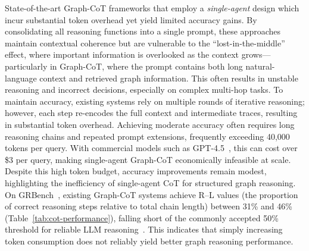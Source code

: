 State-of-the-art Graph-CoT frameworks that employ a \textit{single-agent} design which incur substantial token overhead yet yield limited accuracy gains. 
%
By consolidating all reasoning functions into a single prompt, these approaches maintain contextual coherence but are vulnerable to the ``lost-in-the-middle'' effect, where important information is overlooked as the context grows—particularly in Graph-CoT, where the prompt contains both long natural-language context and retrieved graph information. 
%
This often results in unstable reasoning and incorrect decisions, especially on complex multi-hop tasks. 
%
To maintain accuracy, existing systems rely on multiple rounds of iterative reasoning; however, each step re-encodes the full context and intermediate traces, resulting in substantial token overhead. 
%
Achieving moderate accuracy often requires long reasoning chains and repeated prompt extensions, frequently exceeding 40{,}000 tokens per query. With commercial models such as GPT-4.5~\cite{openai_pricing}, this can cost over \$3 per query, making single-agent Graph-CoT economically infeasible at scale. 
%
Despite this high token budget, accuracy improvements remain modest, highlighting the inefficiency of single-agent CoT for structured graph reasoning. 
%
On GRBench~\cite{jin2024graph}, existing Graph-CoT systems achieve R–L values (the proportion of correct reasoning steps relative to total chain length) between 31\% and 46\% (Table~\ref{tab:cot-performance}), falling short of the commonly accepted 50\% threshold for reliable LLM reasoning~\cite{chen2024benchmarking,vendrow2025largelanguagemodelbenchmarks}. 
%
This indicates that simply increasing token consumption does not reliably yield better graph reasoning performance.




